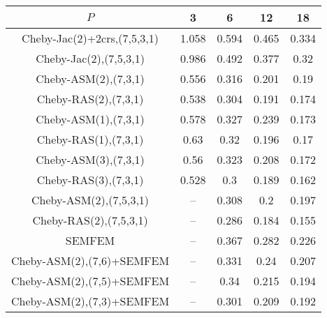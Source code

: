 \begin{table*}
\centering
\begin{tabular}{||c||cccc||}
	\hline
	$P$ & 3 & 6 & 12 & 18 \\
	\hline\hline
	Cheby-Jac(2)+2crs,(7,5,3,1)	&	1.058	&	0.594	&	0.465	&	0.334\\
	Cheby-Jac(2),(7,5,3,1)	&	0.986	&	0.492	&	0.377	&	0.32\\
	Cheby-ASM(2),(7,3,1)	&	0.556	&	0.316	&	0.201	&	0.19\\
	Cheby-RAS(2),(7,3,1)	&	0.538	&	0.304	&	0.191	&	0.174\\
	Cheby-ASM(1),(7,3,1)	&	0.578	&	0.327	&	0.239	&	0.173\\
	Cheby-RAS(1),(7,3,1)	&	0.63	&	0.32	&	0.196	&	0.17\\
	Cheby-ASM(3),(7,3,1)	&	0.56	&	0.323	&	0.208	&	0.172\\
	Cheby-RAS(3),(7,3,1)	&	0.528	&	0.3	&	0.189	&	0.162\\
	Cheby-ASM(2),(7,5,3,1)	&	 --	&	0.308	&	0.2	&	0.197\\
	Cheby-RAS(2),(7,5,3,1)	&	 --	&	0.286	&	0.184	&	0.155\\
	SEMFEM	&	 --	&	0.367	&	0.282	&	0.226\\
	Cheby-ASM(2),(7,6)+SEMFEM	&	 --	&	0.331	&	0.24	&	0.207\\
	Cheby-ASM(2),(7,5)+SEMFEM	&	 --	&	0.34	&	0.215	&	0.194\\
	Cheby-ASM(2),(7,3)+SEMFEM	&	 --	&	0.301	&	0.209	&	0.192\\
\hline
\end{tabular}
\caption{\label{table:foobar}}
\end{table*}
